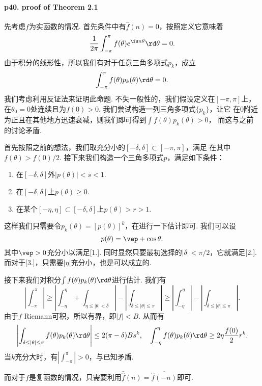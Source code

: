   \paragraph{p40. proof of Theorem 2.1}
    先考虑$f$为实函数的情况. 首先条件中有$\hat{f}(n)=0$，按照定义它意味着
    \[
      \frac{1}{2\pi}\int_{-\pi}^\pi f(\theta)e^{\iu n\theta} \rd\theta=0.
    \]
    由于积分的线形性，所以我们有对于任意三角多项式$p_k$，成立
    \[
      \int_{-\pi}^\pi f(\theta)p_k(\theta)\rd\theta = 0.
    \]
    我们考虑利用反证法来证明此命题. 不失一般性的，我们假设定义在$[-\pi, \pi]$上，
    在$\theta_0=0$处连续且为$f(0)>0$. 我们尝试构造一列三角多项式$\{p_k\}$，让它
    在$0$附近为正且在其他地方迅速衰减，则我们即可得到$\int f(\theta)p_k(\theta)>0$，
    而这与之前的讨论矛盾.\par
    首先按照之前的想法，我们取充分小的$[-\delta,\delta]\subset [-\pi,\pi]$，满足
    在其中$f(\theta)>f(0)/2$. 接下来我们构造一个三角多项式$p$，满足如下条件：
    \begin{enumerate}
      \item 在$[-\delta,\delta]$外$|p(\theta)|<s<1$.
      \item 在$[-\delta,\delta]$上$p(\theta)\ge 0$.
      \item 在某个$[-\eta,\eta]\subset[-\delta,\delta]$上$p(\theta)>r>1$.
    \end{enumerate}
    这样我们只需要令$p_k(\theta) = [p(\theta)]^k$，在进行一下估计即可. 我们可以设
    \[
      p(\theta) = \vep + \cos\theta.
    \]
    其中$\vep>0$充分小以满足[1.]. 同时显然只要最初选择的$|\delta|<\pi/2$，它就满足[2.].
    而对于[3.]，只需要$|\eta|$充分小，也是可以成立的. \par
    接下来我们对积分$\int f(\theta)p_k(\theta)\rd\theta$进行估计. 我们有
    \[
      \left|\int_{-\pi}^\pi\right| \ge 
      \left|\int_{-\eta}^\eta + \int_{\eta\le|\theta|<\delta}\right|
      -\left|\int_{\delta\le|\theta|\le \pi}\right|
      \ge \left|\int_{-\eta}^\eta\right|
      -\left|\int_{\delta\le|\theta|\le \pi}\right|.
    \]
    由于$f$ Riemann可积，所以有界，即$|f|<B$. 从而有
    \begin{gather*}
      \left|\int_{\delta\le|\theta|\le \pi}f(\theta)p_k(\theta)\rd\theta\right|
       \le 2(\pi-\delta)Bs^k,\quad
      \int_{-\eta}^\eta f(\theta)p_k(\theta)\rd\theta \ge 2\eta \frac{f(0)}{2}r^k.
    \end{gather*}
    当$k$充分大时，有$|\int_{-\pi}^\pi|>0$，与已知矛盾. \par
    而对于$f$是复函数的情况，只需要利用$\bar{\hat{f}}(n) = \overline{\hat{f}(-n)}$即可.

